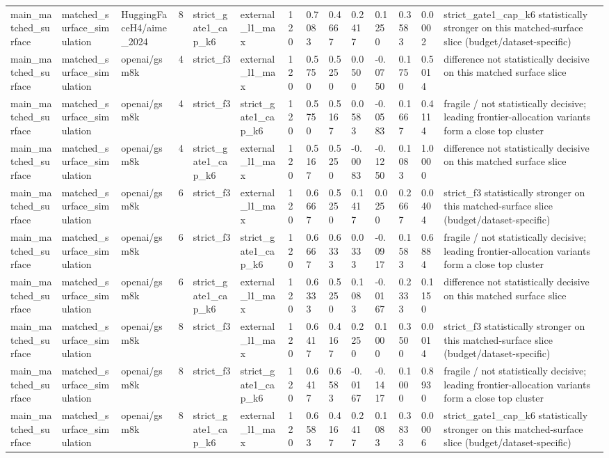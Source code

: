 \begin{tabular}{llllllllllllll}
main\_matched\_surface & matched\_surface\_simulation & HuggingFaceH4/aime\_2024 & 8 & strict\_gate1\_cap\_k6 & external\_l1\_max & 120 & 0.7083 & 0.4667 & 0.2417 & 0.1250 & 0.3583 & 0.0002 & strict\_gate1\_cap\_k6 statistically stronger on this matched-surface slice (budget/dataset-specific) \\
main\_matched\_surface & matched\_surface\_simulation & openai/gsm8k & 4 & strict\_f3 & external\_l1\_max & 120 & 0.5750 & 0.5250 & 0.0500 & -0.0750 & 0.1750 & 0.5014 & difference not statistically decisive on this matched surface slice \\
main\_matched\_surface & matched\_surface\_simulation & openai/gsm8k & 4 & strict\_f3 & strict\_gate1\_cap\_k6 & 120 & 0.5750 & 0.5167 & 0.0583 & -0.0583 & 0.1667 & 0.4114 & fragile / not statistically decisive; leading frontier-allocation variants form a close top cluster \\
main\_matched\_surface & matched\_surface\_simulation & openai/gsm8k & 4 & strict\_gate1\_cap\_k6 & external\_l1\_max & 120 & 0.5167 & 0.5250 & -0.0083 & -0.1250 & 0.1083 & 1.0000 & difference not statistically decisive on this matched surface slice \\
main\_matched\_surface & matched\_surface\_simulation & openai/gsm8k & 6 & strict\_f3 & external\_l1\_max & 120 & 0.6667 & 0.5250 & 0.1417 & 0.0250 & 0.2667 & 0.0404 & strict\_f3 statistically stronger on this matched-surface slice (budget/dataset-specific) \\
main\_matched\_surface & matched\_surface\_simulation & openai/gsm8k & 6 & strict\_f3 & strict\_gate1\_cap\_k6 & 120 & 0.6667 & 0.6333 & 0.0333 & -0.0917 & 0.1583 & 0.6884 & fragile / not statistically decisive; leading frontier-allocation variants form a close top cluster \\
main\_matched\_surface & matched\_surface\_simulation & openai/gsm8k & 6 & strict\_gate1\_cap\_k6 & external\_l1\_max & 120 & 0.6333 & 0.5250 & 0.1083 & -0.0167 & 0.2333 & 0.1150 & difference not statistically decisive on this matched surface slice \\
main\_matched\_surface & matched\_surface\_simulation & openai/gsm8k & 8 & strict\_f3 & external\_l1\_max & 120 & 0.6417 & 0.4167 & 0.2250 & 0.1000 & 0.3500 & 0.0014 & strict\_f3 statistically stronger on this matched-surface slice (budget/dataset-specific) \\
main\_matched\_surface & matched\_surface\_simulation & openai/gsm8k & 8 & strict\_f3 & strict\_gate1\_cap\_k6 & 120 & 0.6417 & 0.6583 & -0.0167 & -0.1417 & 0.1000 & 0.8930 & fragile / not statistically decisive; leading frontier-allocation variants form a close top cluster \\
main\_matched\_surface & matched\_surface\_simulation & openai/gsm8k & 8 & strict\_gate1\_cap\_k6 & external\_l1\_max & 120 & 0.6583 & 0.4167 & 0.2417 & 0.1083 & 0.3833 & 0.0006 & strict\_gate1\_cap\_k6 statistically stronger on this matched-surface slice (budget/dataset-specific) \\
\hline
\end{tabular}
